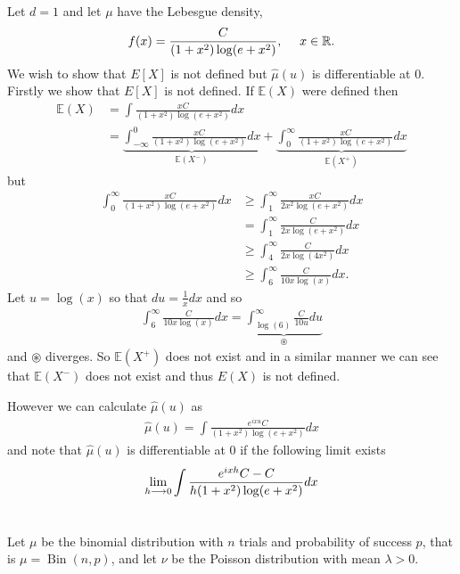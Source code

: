 \documentclass{unswmaths}
\begin{document}
\subsection{}
Let $ d = 1 $ and let $ \mu $ have the  Lebesgue density,
\begin{align}
	f(x) = \frac{C}{(1+x^2) \log(e + x^2)}, \ \ \ \ x \in \mathbb{R}.
\end{align}
We wish to show that $ E[X] $ is not defined but $ \hat{\mu}(u) $ is differentiable at $ 0 $. Firstly we show that $ E[X] $ is not defined. 
If $ \mathbb{E}(X) $ were defined then
\begin{align}
	\mathbb{E}(X) &= \int \frac{xC}{(1+x^2)\log(e + x^2)} dx \\
		&=  \underbrace{\int_{-\infty}^0 \frac{xC}{(1+x^2)\log(e + x^2)} dx}_{\mathbb{E}(X^-)} + \underbrace{\int_0^{\infty} \frac{xC}{(1+x^2)\log(e + x^2)} dx}_{\mathbb{E}(X^+)}
\end{align}
but
\begin{align}
	\int_0^{\infty} \frac{xC}{(1+x^2)\log(e + x^2)} dx &\geq \int_1^{\infty} \frac{xC}{2x^2\log(e + x^2)} dx \\
	&= \int_1^{\infty} \frac{C}{2x\log(e + x^2)} dx \\
	&\geq \int_4^{\infty} \frac{C}{2x\log(4x^2)} dx \\
	&\geq \int_6^{\infty} \frac{C}{10x\log(x)} dx.
\end{align}
Let $ u = \log(x) $ so that $ du = \frac{1}{x} dx $
and so 
\begin{align}
	\int_6^{\infty} \frac{C}{10x\log(x)} dx = \underbrace{\int_{\log(6)}^\infty \frac{C}{10u} du}_{\circledast}
\end{align}
and $ \circledast $ diverges. So $ \mathbb{E}(X^+) $ does not exist and in a similar manner we can see that $ \mathbb{E}(X^-) $ does not exist and thus $ E(X) $ is not defined.

However we can calculate $ \hat{\mu}(u) $ as
\begin{align}
	\hat{\mu}(u) = \int \frac{e^{ixu}C}{(1+x^2)\log(e + x^2)}dx
\end{align}
and note that $ \hat{\mu}(u) $ is differentiable at $ 0 $ if the following limit exists
\begin{align}
	\lim_{h \longrightarrow 0} \int \frac{e^{ixh}C - C}{h(1+x^2)\log(e + x^2)}dx
\end{align}
\section{}
Let $\mu$ be the binomial distribution with $ n $ trials and probability of success $ p $, that is $ \mu = \operatorname{Bin}(n,p) $, and let $ \nu $ be the Poisson distribution with mean $ \lambda > 0 $. 
\end{document}

